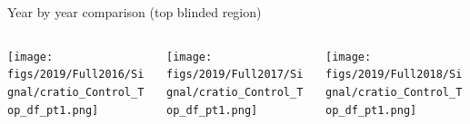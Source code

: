 \documentclass[9pt]{beamer}
\begin{document}
\begin{frame}{Year by year comparison (top blinded region)}
\justifying
\begin{columns}
		\hspace{5pt}
		\begin{column}{0.32\textwidth}
			\begin{center}
				\begin{block}{}\end{block}	
     			\texttt{[image: figs/2019/Full2016/Signal/cratio\_Control\_Top\_df\_pt1.png]}
    		\end{center}		
		\end{column} \hfill
		\begin{column}{0.32\textwidth}
			\begin{center}
				\begin{block}{}\end{block}	
     			\texttt{[image: figs/2019/Full2017/Signal/cratio\_Control\_Top\_df\_pt1.png]}
    		\end{center}		
		\end{column} \hfill
		\begin{column}{0.32\textwidth}
			\begin{center}
				\begin{block}{}\end{block}	
     			\texttt{[image: figs/2019/Full2018/Signal/cratio\_Control\_Top\_df\_pt1.png]}
   			 \end{center}
		\end{column} \hfill
	\end{columns} \vspace{-5pt}
	\begin{columns}
		\hspace{5pt}

\end{columns}
\end{frame}
\end{document}

